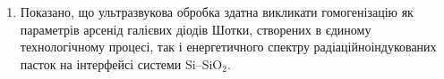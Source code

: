 \begin{enumerate}[leftmargin=0cm,itemindent=3em]
\item Показано, що ультразвукова обробка здатна викликати гомогенізацію як параметрів арсенід галієвих діодів Шотки, створених в єдиному технологічному процесі, так і енергетичного спектру радіаційноіндукованих пасток
    на інтерфейсі системи    Si--SiO$_2$.

\end{enumerate}

